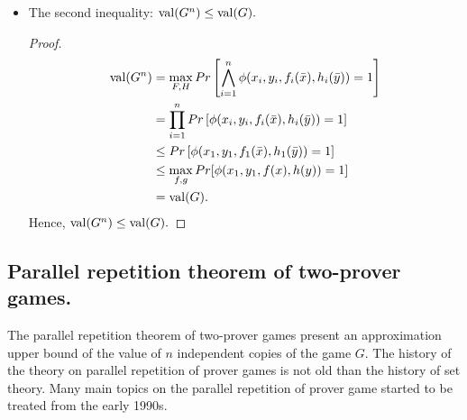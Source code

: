 \begin{itemize}
\begin{proof}
$Pr \left[\bigwedge\limits_{i=1}^n \phi (x_i,y_i, f_i(\bar{x}), h_i(\bar{y}))=1 \right]= \prod\limits_{i=1}^n Pr \left[ \phi (x_i,y_i, f(\bar{x}), h(\bar{y}))=1 \right]=\prod\limits_{i=1}^n \val (G)= \val (G)^n.$

$(f,h)$ is the optimal couple of strategies for the game $G$, this does not means that the couple $(F,H)$  is the optimal couple of the strategies for the parallel repetition $G^n$. Then, the winning probability for $G^n$ over the optimal couple of strategies is:

$\val (G^n)= \max\limits_{F,H} Pr \left[\bigwedge\limits_{i=1}^n \phi (x_i,y_i, f_i(\bar{x}), h_i(\bar{y}))=1 \right] \geq Pr \left[\bigwedge\limits_{i=1}^n \phi (x_i,y_i, f_i(\bar{x}), h_i(\bar{y}))=1 \right]= \prod\limits_{i=1}^n Pr \left[ \phi (x_i,y_i, f(\bar{x}), h(\bar{y}))=1 \right]=\prod\limits_{i=1}^n \val (G)= \val (G)^n .$

Hence, $\val (G^n) \geq \val (G)^n.$
\end{proof}

\item The second inequality: $\mathrm{val} (G^n) \leq \mathrm{val} (G).$

\begin{proof}
 \begin{align*}
 \mathrm{val} (G^n) & = \max\limits_{F,H} Pr \left[\bigwedge\limits_{i=1}^n \phi (x_i,y_i, f_i(\bar{x}), h_i(\bar{y}))=1 \right] \\
 &= \prod\limits_{i=1}^n Pr \left[ \phi (x_i,y_i, f_i(\bar{x}), h_i(\bar{y}))=1 \right] \\
 & \leq Pr \left[ \phi (x_1,y_1, f_1(\bar{x}), h_1(\bar{y}))=1 \right] \\
 &  \leq \max\limits_{f,g} Pr[\phi(x_1,y_1,f(x),h(y))=1] \\
 & = \mathrm{val} (G).
 \end{align*}
Hence, $\mathrm{val} (G^n) \leq \mathrm{val} (G).$
\end{proof}


\end{itemize}


\subsection{Parallel repetition theorem of two-prover games.}

The parallel repetition theorem of  two-prover games present an  approximation upper bound of the value of $n$ independent copies of the game $G$. The history of the theory on parallel repetition of prover games is not old than the history of set theory. Many main topics on the parallel repetition of prover game started to be treated from the early 1990s. 

